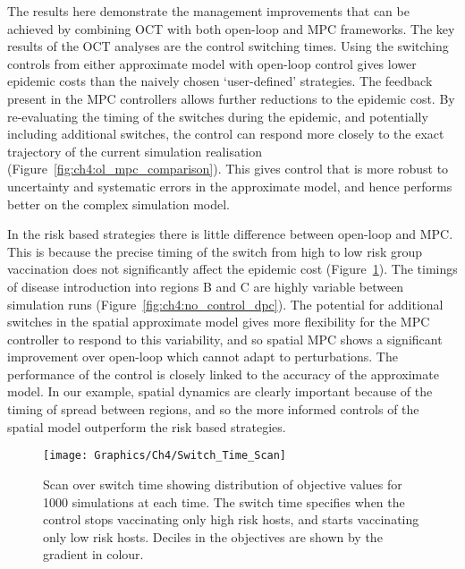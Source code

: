 The results here demonstrate the management improvements that can be achieved by combining OCT with both open-loop and MPC frameworks. The key results of the OCT analyses are the control switching times. Using the switching controls from either approximate model with open-loop control gives lower epidemic costs than the naively chosen `user-defined' strategies. The feedback present in the MPC controllers allows further reductions to the epidemic cost. By re-evaluating the timing of the switches during the epidemic, and potentially including additional switches, the control can respond more closely to the exact trajectory of the current simulation realisation (Figure~\ref{fig:ch4:ol_mpc_comparison}). This gives control that is more robust to uncertainty and systematic errors in the approximate model, and hence performs better on the complex simulation model.

In the risk based strategies there is little difference between open-loop and MPC. This is because the precise timing of the switch from high to low risk group vaccination does not significantly affect the epidemic cost (Figure~\ref{fig:ch4:switch_time_scan}). The timings of disease introduction into regions B and C are highly variable between simulation runs (Figure~\ref{fig:ch4:no_control_dpc}). The potential for additional switches in the spatial approximate model gives more flexibility for the MPC controller to respond to this variability, and so spatial MPC shows a significant improvement over open-loop which cannot adapt to perturbations. The performance of the control is closely linked to the accuracy of the approximate model. In our example, spatial dynamics are clearly important because of the timing of spread between regions, and so the more informed controls of the spatial model outperform the risk based strategies.

\begin{figure}[h]
    \begin{center}
        \texttt{[image: Graphics/Ch4/Switch\_Time\_Scan]}
        \caption{Scan over switch time showing distribution of objective values for 1000 simulations at each time. The switch time specifies when the control stops vaccinating only high risk hosts, and starts vaccinating only low risk hosts. Deciles in the objectives are shown by the gradient in colour.}
        \label{fig:ch4:switch_time_scan}
    \end{center}
\end{figure}

\FloatBarrier


